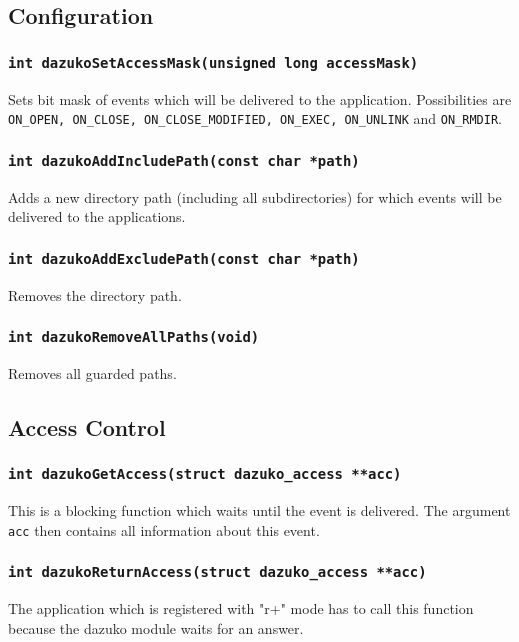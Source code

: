 \subsection*{Configuration}
\subsubsection{\texttt{int dazukoSetAccessMask(unsigned long accessMask)}}
Sets bit mask of events which will be delivered to the application.
Possibilities are
\texttt{ON\_OPEN, ON\_CLOSE, ON\_CLOSE\_MODIFIED, ON\_EXEC, ON\_UNLINK} and
\texttt{ON\_RMDIR}.

\subsubsection{\texttt{int dazukoAddIncludePath(const char *path)}}
Adds a new directory path (including all subdirectories) for which events will
be delivered to the applications.

\subsubsection{\texttt{int dazukoAddExcludePath(const char *path)}}
Removes the directory path.

\subsubsection{\texttt{int dazukoRemoveAllPaths(void)}}
Removes all guarded paths.

\subsection*{Access Control}
\subsubsection{\texttt{int dazukoGetAccess(struct dazuko\_access **acc)}}
This is a blocking function which waits until the event is delivered. The argument \texttt{acc}
then contains all information about this event.

\subsubsection{\texttt{int dazukoReturnAccess(struct dazuko\_access **acc)}}
The application which is registered with "r+" mode has to call this function because
the dazuko module waits for an answer.

